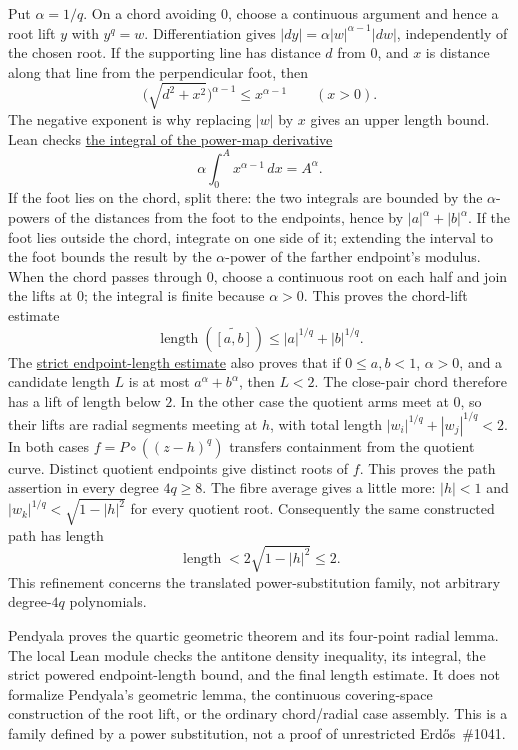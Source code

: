 \documentclass[11pt]{article}
\renewcommand{\commit}{7380b7871687b6bcc41ca0143c61f232e8af6500}
\renewcommand{\repobase}{https://github.com/wcook04/plectis-erdos/blob/\commit}
\begin{document}
Put $\alpha=1/q$. On a chord avoiding $0$, choose a continuous
argument and hence a root lift $y$ with $y^q=w$. Differentiation gives
$|dy|=\alpha|w|^{\alpha-1}|dw|$, independently of the chosen root.
If the supporting line has distance $d$ from $0$, and $x$ is distance
along that line from the perpendicular foot, then
\[
  \bigl(\sqrt{d^2+x^2}\bigr)^{\alpha-1}
    \le x^{\alpha-1}\qquad(x>0).
\]
The negative exponent is why replacing $|w|$ by $x$ gives an upper
length bound. Lean checks \href{\repobase/research_corpus/Erdos1041/QuarticQuotientFiberCase.lean\#L37}{the integral of the power-map derivative}
\[
  \alpha\int_0^A x^{\alpha-1}\,dx=A^\alpha.
\]
If the foot lies on the chord, split there: the two
integrals are bounded by the $\alpha$-powers of the distances from the
foot to the endpoints, hence by $|a|^\alpha+|b|^\alpha$. If the foot
lies outside the chord, integrate on one side of it; extending the
interval to the foot bounds the result by the $\alpha$-power of the
farther endpoint's modulus. When the chord passes through $0$, choose
a continuous root on each half and join the lifts at $0$; the integral
is finite because $\alpha>0$. This proves the chord-lift estimate
\[
  \operatorname{length}(\widetilde{[a,b]})
    \le |a|^{1/q}+|b|^{1/q}.
\]
The \href{\repobase/research_corpus/Erdos1041/QuarticQuotientFiberCase.lean\#L59}{strict endpoint-length estimate} also proves that if
$0\le a,b<1$, $\alpha>0$, and a candidate length $L$ is at most
$a^\alpha+b^\alpha$, then $L<2$.  The close-pair chord therefore has a lift of length below $2$.
In the other case the quotient arms meet at $0$, so their lifts are radial
segments meeting at $h$, with total length
$|w_i|^{1/q}+|w_j|^{1/q}<2$. In both cases $f=P\circ((z-h)^q)$
transfers containment from the quotient curve. Distinct quotient endpoints
give distinct roots of $f$. This proves the path assertion in every degree
$4q\ge8$. The fibre average gives a little more: $|h|<1$ and
$|w_k|^{1/q}<\sqrt{1-|h|^2}$ for every quotient root. Consequently the same
constructed path has length
\[
 \operatorname{length}<2\sqrt{1-|h|^2}\le2.
\]
This refinement concerns the translated power-substitution family, not
arbitrary degree-$4q$ polynomials.

Pendyala proves the quartic geometric theorem and its four-point radial
lemma.  The local Lean module
checks the antitone density inequality, its integral, the strict powered
endpoint-length bound, and the final length estimate.  It does not formalize
Pendyala's geometric lemma, the continuous covering-space construction of the
root lift, or the ordinary chord/radial case assembly.  This is a family defined by a power substitution, not a proof of unrestricted Erd\H{o}s~\#1041.
\end{document}
